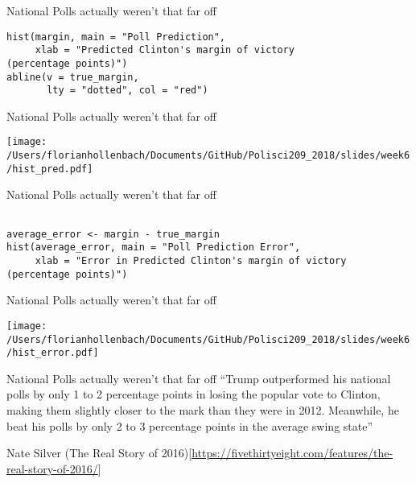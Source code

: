 \documentclass[presentation]{beamer}
\begin{document}
\begin{frame}[fragile,shrink=25,label={sec:org95e579f}]{National Polls actually weren't that far off}
 \begin{verbatim}
hist(margin, main = "Poll Prediction",
     xlab = "Predicted Clinton's margin of victory
(percentage points)")
abline(v = true_margin,
       lty = "dotted", col = "red")
\end{verbatim}
\end{frame}




\begin{frame}[label={sec:org42336f5}]{National Polls actually weren't that far off}
\begin{center}
\texttt{[image: /Users/florianhollenbach/Documents/GitHub/Polisci209\_2018/slides/week6/hist\_pred.pdf]}
\end{center}
\end{frame}

\begin{frame}[fragile,label={sec:org5131112}]{National Polls actually weren't that far off}
 \begin{verbatim}

average_error <- margin - true_margin
hist(average_error, main = "Poll Prediction Error",
     xlab = "Error in Predicted Clinton's margin of victory
(percentage points)")
\end{verbatim}
\end{frame}


\begin{frame}[label={sec:orgf0a3026}]{National Polls actually weren't that far off}
\begin{center}
\texttt{[image: /Users/florianhollenbach/Documents/GitHub/Polisci209\_2018/slides/week6/hist\_error.pdf]}
\end{center}
\end{frame}


\begin{frame}[label={sec:org28438c6}]{National Polls actually weren't that far off}
``Trump outperformed his national polls by only 1 to 2 percentage points in losing the popular vote to Clinton, making them slightly closer to the mark than they were in 2012. Meanwhile, he beat his polls by only 2 to 3 percentage points in the average swing state''

\alert{Nate Silver} (The Real Story of 2016)[\url{https://fivethirtyeight.com/features/the-real-story-of-2016/}]
\end{frame}
\end{document}
